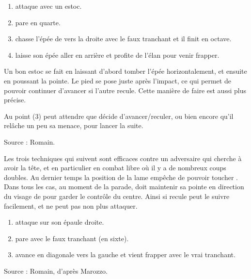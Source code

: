 \begin{technique}

\begin{enumerate}
	\item \A attaque avec un estoc.
	\item \D pare en quarte.
	\item \D chasse l'épée de \A vers la droite avec le faux tranchant et il finit en octave.
	\item \D laisse son épée aller en arrière et profite de l'élan pour venir frapper.
\end{enumerate}

Un bon estoc se fait en laissant d'abord tomber l'épée horizontalement, et ensuite en poussant la pointe.
Le pied se pose juste après l'impact, ce qui permet de pouvoir continuer d'avancer si l'autre recule.
Cette manière de faire est aussi plus précise.

Au point (3) \D peut attendre que \A décide d'avancer/reculer, ou bien encore qu'il relâche un peu sa menace, pour lancer la suite.

Source : Romain.

\end{technique}


Les trois techniques qui suivent sont efficaces contre un adversaire qui cherche à avoir la tête, et en particulier en combat libre où il y a de nombreux coups doubles.
Au dernier temps la position de la lame empêche \A de pouvoir toucher \D.
Dans tous les cas, au moment de la parade, \D doit maintenir sa pointe en direction du visage de \A pour garder le contrôle du centre.
Ainsi si \A recule \D peut le suivre facilement, et \A ne peut pas non plus attaquer.


\begin{technique}
\label{épée-longue:italien:fiore:tech:faux-tranchant-droite}

\begin{enumerate}
	\item \A attaque \D sur son épaule droite.
	
	\item \D pare avec le faux tranchant (en sixte).
	
	\item \D avance en diagonale vers la gauche et vient frapper \A avec le vrai tranchant.
\end{enumerate}

Source : Romain, d'après Marozzo.

\end{technique}


